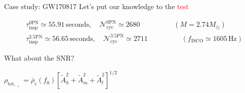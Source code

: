 \documentclass[xcolor=dvipsnames,handout,t]{beamer}
\newcommand{\red}[1]{\textcolor{red}{#1}}
\begin{document}
\begin{frame}{Case study: GW170817}  {Let's put our knowledge to the \red{test}}
\vspace{-7mm}
  \begin{footnotesize}
    \begin{align*}
      &\tau_\text{insp}^{0\text{PN}} \simeq 55.91\,\text{seconds}, \quad \mathcal{N}_\text{cyc}^{0\text{PN}} \simeq 2680 \hspace{2cm} (M=2.74 M_\odot) \\
      &\tau_\text{insp}^{3.5\text{PN}} \simeq 56.65\,\text{seconds}, \quad \mathcal{N}_\text{cyc}^{3.5\text{PN}} \simeq 2711 \hspace{2cm} (f_\text{ISCO}\simeq 1605\,\text{Hz}) 
    \end{align*}
  \end{footnotesize}
  What about the SNR? \quad
  \begin{small}$\rho_{\text{tot},\llcorner}  = {\bar\rho_c(f_0)\left[\tilde{A}_h^2 + \tilde{A}_m^2 + \tilde{A}_l^2 \right]^{1/2}}$   
  \end{small}
  

\end{frame}
\end{document}

